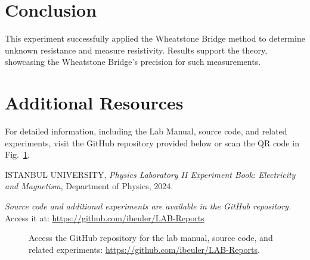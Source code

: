 \documentclass[journal]{IEEEtran}
\begin{document}
\section{Conclusion}
This experiment successfully applied the Wheatstone Bridge method to determine unknown resistance and measure resistivity. Results support the theory, showcasing the Wheatstone Bridge's precision for such measurements.


\section{Additional Resources}
For detailed information, including the Lab Manual, source code, and related experiments, visit the GitHub repository provided below or scan the QR code in Fig.~\ref{fig:qr}.

\begin{thebibliography}{9}
    ISTANBUL UNIVERSITY, 
    \textit{Physics Laboratory II Experiment Book: Electricity and Magnetism}, 
    Department of Physics, 2024.

    \textit{Source code and additional experiments are available in the GitHub repository.} \\ 
    Access it at: \url{https://github.com/ibeuler/LAB-Reports}

\end{thebibliography}

\begin{figure}[H]
    
    \centering
    \begin{minipage}{0.15\textwidth}
        \centering
    \end{minipage}%
    \begin{minipage}{0.2\textwidth}
        \raggedright
        \caption{Access the GitHub repository for the lab manual, source code, and related experiments: \href{https://github.com/ibeuler/LAB-Reports}{\url{https://github.com/ibeuler/LAB-Reports}}.}
    \end{minipage}
    \label{fig:qr}
\end{figure}
\end{document}

